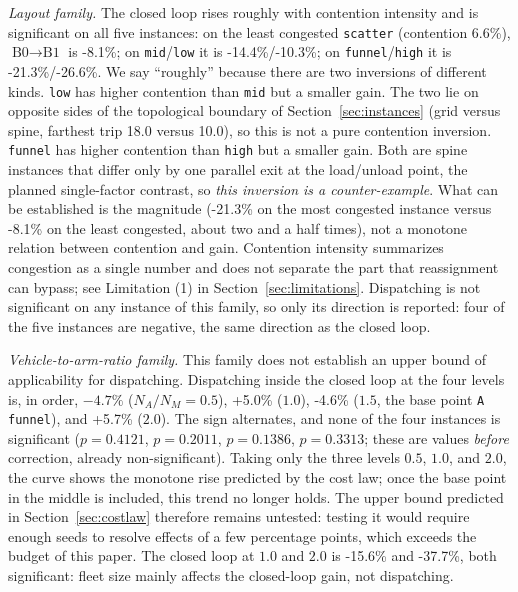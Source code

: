 \documentclass[manuscript,screen,review]{acmart}
\newcommand{\GainProbeStarve}{4.7\%}     %
\newcommand{\GainProbeFleetBase}{-4.6\%} %
\newcommand{\GainProbeFleetOne}{+5.0\%}  %
\newcommand{\GainProbeFleetTwo}{+5.7\%}  %
\newcommand{\GainLoopFunnel}{-21.3\%}    %
\newcommand{\GainLoopHigh}{-26.6\%}      %
\newcommand{\GainLoopMid}{-14.4\%}       %
\newcommand{\GainLoopLow}{-10.3\%}       %
\newcommand{\GainLoopScatter}{-8.1\%}    %
\newcommand{\GainLoopFleetOne}{-15.6\%}  %
\newcommand{\GainLoopFleetTwo}{-37.7\%}  %
\newcommand{\PProbeFleetHalfRaw}{=0.4121}
\newcommand{\PProbeFleetOneRaw}{=0.2011}
\newcommand{\PProbeFleetBaseRaw}{=0.1386}
\newcommand{\PProbeFleetTwoRaw}{=0.3313}
\newcommand{\ContentionLo}{6.6\%}
\newcommand{\LegDumbbell}{10.0}          %
\newcommand{\LegGrid}{18.0}              %
\begin{document}
\emph{Layout family.}
The closed loop rises roughly with contention intensity and is significant on all five instances: on the least congested \texttt{scatter} (contention \ContentionLo{}), $\text{B0}\to\text{B1}$ is \GainLoopScatter{}; on \texttt{mid}/\texttt{low} it is \GainLoopMid{}/\GainLoopLow{}; on \texttt{funnel}/\texttt{high} it is \GainLoopFunnel{}/\GainLoopHigh{}.
We say ``roughly'' because there are two inversions of different kinds.
\texttt{low} has higher contention than \texttt{mid} but a smaller gain. The two lie on opposite sides of the topological boundary of Section~\ref{sec:instances} (grid versus spine, farthest trip \LegGrid{} versus \LegDumbbell{}), so this is not a pure contention inversion.
\texttt{funnel} has higher contention than \texttt{high} but a smaller gain. Both are spine instances that differ only by one parallel exit at the load/unload point, the planned single-factor contrast, so \emph{this inversion is a counter-example}.
What can be established is the magnitude (\GainLoopFunnel{} on the most congested instance versus \GainLoopScatter{} on the least congested, about two and a half times), not a monotone relation between contention and gain.
Contention intensity summarizes congestion as a single number and does not separate the part that reassignment can bypass; see Limitation (1) in Section~\ref{sec:limitations}.
Dispatching is not significant on any instance of this family, so only its direction is reported: four of the five instances are negative, the same direction as the closed loop.

\emph{Vehicle-to-arm-ratio family.}
This family does not establish an upper bound of applicability for dispatching. Dispatching inside the closed loop at the four levels is, in order, $-\GainProbeStarve$ ($N_A/N_M=0.5$), \GainProbeFleetOne{} ($1.0$), \GainProbeFleetBase{} ($1.5$, the base point \texttt{A funnel}), and \GainProbeFleetTwo{} ($2.0$). The sign alternates, and none of the four instances is significant ($p\PProbeFleetHalfRaw$, $p\PProbeFleetOneRaw$, $p\PProbeFleetBaseRaw$, $p\PProbeFleetTwoRaw$; these are values \emph{before} correction, already non-significant).
Taking only the three levels $0.5$, $1.0$, and $2.0$, the curve shows the monotone rise predicted by the cost law; once the base point in the middle is included, this trend no longer holds.
The upper bound predicted in Section~\ref{sec:costlaw} therefore remains untested: testing it would require enough seeds to resolve effects of a few percentage points, which exceeds the budget of this paper.
The closed loop at $1.0$ and $2.0$ is \GainLoopFleetOne{} and \GainLoopFleetTwo{}, both significant: fleet size mainly affects the closed-loop gain, not dispatching.
\end{document}
